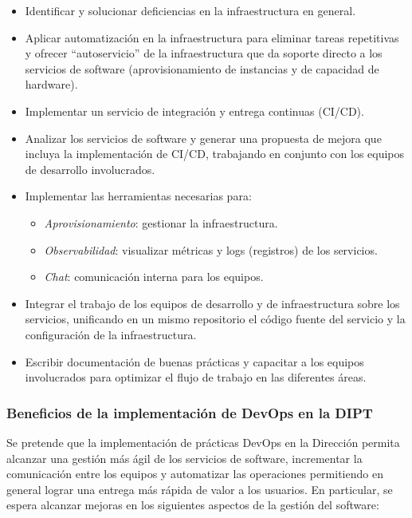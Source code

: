 \begin{itemize}
\item Identificar y solucionar deficiencias en la infraestructura en general.
\item Aplicar automatización en la infraestructura para eliminar tareas repetitivas y ofrecer “autoservicio” de la infraestructura que da soporte directo a los servicios de software (aprovisionamiento de instancias y de capacidad de hardware).
\item Implementar un servicio de integración y entrega continuas (CI/CD).
\item Analizar los servicios de software y generar una propuesta de mejora que incluya la implementación de CI/CD,  trabajando en conjunto con los equipos de desarrollo involucrados.
\item Implementar las herramientas necesarias para:
\begin{itemize}
\item \textit{Aprovisionamiento}: gestionar la infraestructura.
\item \textit{Observabilidad}: visualizar métricas y logs (registros) de los servicios.
\item \textit{Chat}: comunicación interna para los equipos.
\end{itemize}
\item Integrar el trabajo de los equipos de desarrollo y de infraestructura sobre los servicios, unificando en un mismo repositorio el código fuente del servicio y la configuración de la infraestructura.
\item Escribir documentación de buenas prácticas y capacitar a los equipos involucrados para optimizar el flujo de trabajo en las diferentes áreas.
\end{itemize}
\subsubsection{Beneficios de la implementación de DevOps en la DIPT}

Se pretende que la implementación de prácticas DevOps en la Dirección permita alcanzar una gestión más ágil de los servicios de software, incrementar la comunicación entre los equipos y automatizar las operaciones permitiendo en general lograr una entrega más rápida de valor a los usuarios. En particular, se espera alcanzar mejoras en los siguientes aspectos de la gestión del software:

